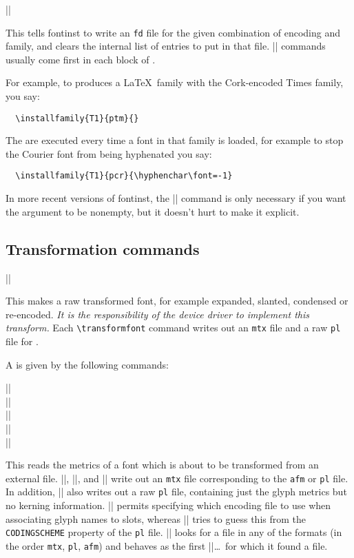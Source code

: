 \documentclass[a4paper]{ltxguide}
\newcommand*{\meta}{\m}
\newcommand*{\marg}{\arg}
\newcommand*{\setfilename}[1]{\texttt{#1}}
\newcommand*{\setpackagename}[1]{\textsf{#1}}
\newcommand{\fontinst}{\setpackagename{font\-inst}\xspace}
\newcommand{\pl} {\setfilename{pl}\xspace}
\newcommand{\fd} {\setfilename{fd}\xspace}
\newcommand{\afm}{\setfilename{afm}\xspace}
\newcommand{\mtx}{\setfilename{mtx}\xspace}
\begin{document}
\begin{decl}
  |\installfamily|
\end{decl}
This tells \fontinst to write an \fd file for the given combination 
of encoding and family, and clears the internal list of entries to 
put in that file. |\installfamily| commands usually come first in each 
block of \meta{install commands}.

For example, to produces a \LaTeX\ family with the Cork-encoded Times 
family, you say:
\begin{verbatim}
  \installfamily{T1}{ptm}{}
\end{verbatim}
The  are executed every time a font in that family is
loaded, for example to stop the Courier font from being hyphenated you
say:
\begin{verbatim}
  \installfamily{T1}{pcr}{\hyphenchar\font=-1}
\end{verbatim}
In more recent versions of \fontinst, the |\installfamily| command is 
only necessary if you want the  argument to be 
nonempty, but it doesn't hurt to make it explicit.




\subsection{Transformation commands}


\begin{decl}
  |\transformfont|
\end{decl}
This makes a raw transformed font, for example expanded, slanted,
condensed or re-encoded.  \emph{It is the responsibility of the device
  driver to implement this transform.}  Each \verb|\transformfont|
command writes out an \mtx file and a raw \pl file for .

A  is given by the following commands:
\begin{decl}
  |\fromafm|\\
  |\fromany|\\
  |\frompl|\\
  |\fromplgivenetx|\marg{pl}\marg{etx}\\
  |\frommtx|
\end{decl}
This reads the metrics of a font which is about to be transformed from
an external file. |\fromafm|, |\frompl|, and |\fromplgivenetx| write out 
an \mtx file corresponding to the \afm or \pl file.  In addition, 
|\formafm| also writes out a raw \pl file, containing just the glyph 
metrics but no kerning information. |\fromplgivenetx| permits 
specifying which encoding file to use when associating glyph names to 
slots, whereas |\frompl| tries to guess this from the 
\texttt{CODINGSCHEME} property of the \pl file. |\fromany| looks for 
a file in any of the formats (in the order \mtx, \pl, \afm) and 
behaves as the first |\from|\dots\ for which it found a file.
\end{document}
